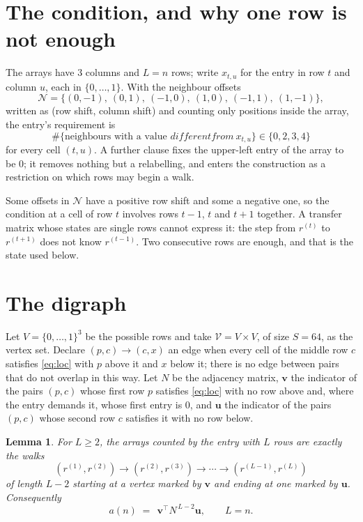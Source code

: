 \documentclass[11pt,a4paper]{article}
\theoremstyle{plain}
\newtheorem{lemma}[theorem]{Lemma}
\theoremstyle{definition}
\begin{document}
\section{The condition, and why one row is not enough}

The arrays have $3$ columns and $L=n$ rows; write $x_{t,u}$ for the entry in
row $t$ and column $u$, each in $\{0,\dots,1\}$. With the neighbour offsets
\[
\mathcal N=\{(0,-1),\ (0,1),\ (-1,0),\ (1,0),\ (-1,1),\ (1,-1)\},
\]
written as (row shift, column shift) and counting only positions inside the array, the
entry's requirement is
\begin{equation}\label{eq:loc}
\#\{\text{neighbours with a value }different from\ x_{t,u}\}\in\{0,2,3,4\}
\end{equation}
for every cell $(t,u)$. A further clause fixes the upper-left entry of the array to be $0$; it removes nothing but a relabelling, and enters the construction as a restriction on which rows may begin a walk.

Some offsets in $\mathcal N$ have a positive row shift and some a negative one, so the
condition at a cell of row $t$ involves rows $t-1$, $t$ and $t+1$ together. A transfer
matrix whose states are single rows cannot express it: the step from $r^{(t)}$ to
$r^{(t+1)}$ does not know $r^{(t-1)}$. Two consecutive rows are enough, and that is
the state used below.

\section{The digraph}

Let $V=\{0,\dots,1\}^{3}$ be the possible rows and take
$\mathcal V=V\times V$, of size $S=64$, as the vertex set. Declare $(p,c)\to(c,x)$ an edge
when every cell of the middle row $c$ satisfies \eqref{eq:loc} with $p$ above it and $x$
below it; there is no edge between pairs that do not overlap in this way. Let $N$ be the
adjacency matrix, $\mathbf{v}$ the indicator of the pairs $(p,c)$ whose first row $p$
satisfies \eqref{eq:loc} with no row above and, where the entry demands it, whose first entry is $0$, and $\mathbf{u}$ the indicator of
the pairs $(p,c)$ whose second row $c$ satisfies it with no row below.

\begin{lemma}\label{lem:walk}
For $L\ge2$, the arrays counted by the entry with $L$ rows are exactly the walks
\[
(r^{(1)},r^{(2)})\to(r^{(2)},r^{(3)})\to\cdots\to(r^{(L-1)},r^{(L)})
\]
of length $L-2$ starting at a vertex marked by $\mathbf{v}$ and ending at one marked by
$\mathbf{u}$. Consequently
\[
a(n)\;=\;\,\mathbf{v}^{\!\top}N^{\,L-2}\mathbf{u},\qquad L=n .
\]
\end{lemma}
\end{document}
